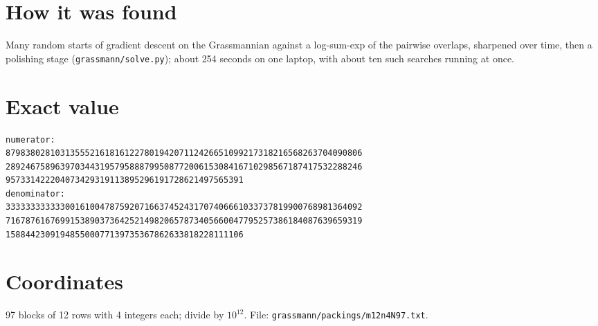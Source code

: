 \documentclass[11pt,a4paper]{article}
\begin{document}
\section{How it was found}
Many random starts of gradient descent on the Grassmannian against a log-sum-exp of the pairwise overlaps, sharpened over time, then a polishing stage (\texttt{grassmann/solve.py}); about 254 seconds on one laptop, with about ten such searches running at once.


\appendix
\section{Exact value}
{\small
\begin{verbatim}
numerator:
879838028103135552161816122780194207112426651099217318216568263704090806
289246758963970344319579588879950877200615308416710298567187417532288246
957331422204073429319113895296191728621497565391
denominator:
333333333333001610047875920716637452431707406661033737819900768981364092
716787616769915389037364252149820657873405660047795257386184087639659319
158844230919485500077139735367862633818228111106
\end{verbatim}}

\section{Coordinates}
97 blocks of 12 rows with 4 integers each; divide by $10^{12}$. File: \texttt{grassmann/packings/m12n4N97.txt}.
{\tiny
\begin{multicols}{3}
\end{multicols}}
\end{document}
